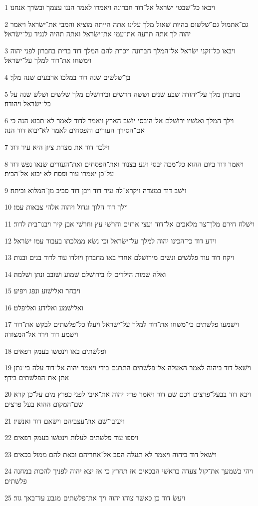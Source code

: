 \par 1 ויבאו כל־שׁבטי ישׂראל אל־דוד חברונה ויאמרו לאמר הננו עצמך ובשׂרך אנחנו׃
\par 2 גם־אתמול גם־שׁלשׁום בהיות שׁאול מלך עלינו אתה הייתה מוציא והמבי את־ישׂראל ויאמר יהוה לך אתה תרעה את־עמי את־ישׂראל ואתה תהיה לנגיד על־ישׂראל׃
\par 3 ויבאו כל־זקני ישׂראל אל־המלך חברונה ויכרת להם המלך דוד ברית בחברון לפני יהוה וימשׁחו את־דוד למלך על־ישׂראל׃
\par 4 בן־שׁלשׁים שׁנה דוד במלכו ארבעים שׁנה מלך׃
\par 5 בחברון מלך על־יהודה שׁבע שׁנים ושׁשׁה חדשׁים ובירושׁלם מלך שׁלשׁים ושׁלשׁ שׁנה על כל־ישׂראל ויהודה׃
\par 6 וילך המלך ואנשׁיו ירושׁלם אל־היבסי יושׁב הארץ ויאמר לדוד לאמר לא־תבוא הנה כי אם־הסירך העורים והפסחים לאמר לא־יבוא דוד הנה׃
\par 7 וילכד דוד את מצדת ציון היא עיר דוד׃
\par 8 ויאמר דוד ביום ההוא כל־מכה יבסי ויגע בצנור ואת־הפסחים ואת־העורים שׂנאו נפשׁ דוד על־כן יאמרו עור ופסח לא יבוא אל־הבית׃
\par 9 וישׁב דוד במצדה ויקרא־לה עיר דוד ויבן דוד סביב מן־המלוא וביתה׃
\par 10 וילך דוד הלוך וגדול ויהוה אלהי צבאות עמו׃
\par 11 וישׁלח חירם מלך־צר מלאכים אל־דוד ועצי ארזים וחרשׁי עץ וחרשׁי אבן קיר ויבנו־בית לדוד׃
\par 12 וידע דוד כי־הכינו יהוה למלך על־ישׂראל וכי נשׂא ממלכתו בעבור עמו ישׂראל׃
\par 13 ויקח דוד עוד פלגשׁים ונשׁים מירושׁלם אחרי באו מחברון ויולדו עוד לדוד בנים ובנות׃
\par 14 ואלה שׁמות הילדים לו בירושׁלם שׁמוע ושׁובב ונתן ושׁלמה׃
\par 15 ויבחר ואלישׁוע ונפג ויפיע׃
\par 16 ואלישׁמע ואלידע ואליפלט׃
\par 17 וישׁמעו פלשׁתים כי־משׁחו את־דוד למלך על־ישׂראל ויעלו כל־פלשׁתים לבקשׁ את־דוד וישׁמע דוד וירד אל־המצודה׃
\par 18 ופלשׁתים באו וינטשׁו בעמק רפאים׃
\par 19 וישׁאל דוד ביהוה לאמר האעלה אל־פלשׁתים התתנם בידי ויאמר יהוה אל־דוד עלה כי־נתן אתן את־הפלשׁתים בידך׃
\par 20 ויבא דוד בבעל־פרצים ויכם שׁם דוד ויאמר פרץ יהוה את־איבי לפני כפרץ מים על־כן קרא שׁם־המקום ההוא בעל פרצים׃
\par 21 ויעזבו־שׁם את־עצביהם וישׂאם דוד ואנשׁיו׃
\par 22 ויספו עוד פלשׁתים לעלות וינטשׁו בעמק רפאים׃
\par 23 וישׁאל דוד ביהוה ויאמר לא תעלה הסב אל־אחריהם ובאת להם ממול בכאים׃
\par 24 ויהי בשׁמעך את־קול צעדה בראשׁי הבכאים אז תחרץ כי אז יצא יהוה לפניך להכות במחנה פלשׁתים׃
\par 25 ויעשׂ דוד כן כאשׁר צוהו יהוה ויך את־פלשׁתים מגבע עד־באך גזר׃

